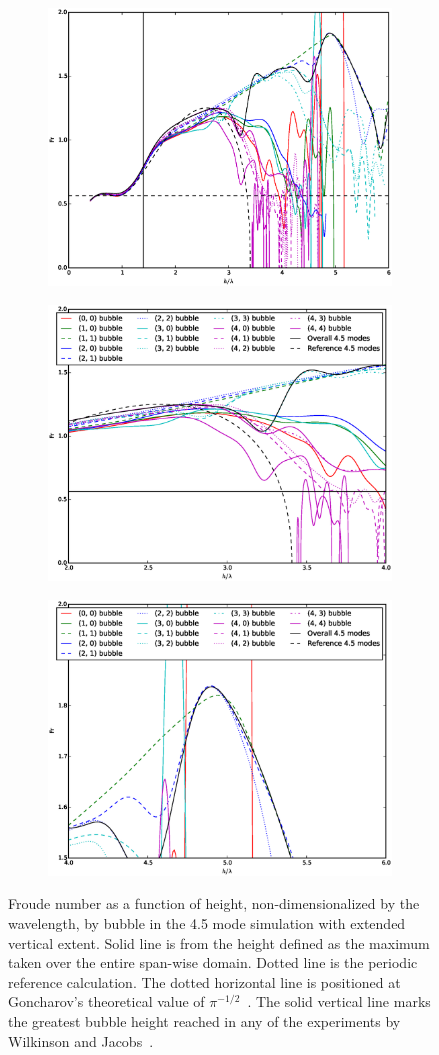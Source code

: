 \begin{figure}
\begin{subfigure}[b]{0.66\columnwidth}
  \includegraphics[width=0.66\columnwidth]{plts/Fr_long_walls}
\end{subfigure}
\begin{subfigure}[b]{0.66\columnwidth}
  \includegraphics[width=0.66\columnwidth]{plts/Fr_long_walls_zoom1}
\end{subfigure}
\begin{subfigure}[b]{0.66\columnwidth}
  \includegraphics[width=0.66\columnwidth]{plts/Fr_long_walls_zoom2}
\end{subfigure}
\caption{ 
Froude number as a function of height, non-dimensionalized by the wavelength, by bubble in the 4.5 mode simulation with extended vertical extent.
Solid line is from the height defined as the maximum taken over the entire span-wise domain.
Dotted line is the periodic reference calculation.
The dotted horizontal line is positioned at Goncharov's theoretical value of $\pi^{-1/2}$~\cite{Goncharov2002}.
The solid vertical line marks the greatest bubble height reached in any of the experiments by Wilkinson and Jacobs~\cite{Wilkinson2007}.
}
\end{figure}


